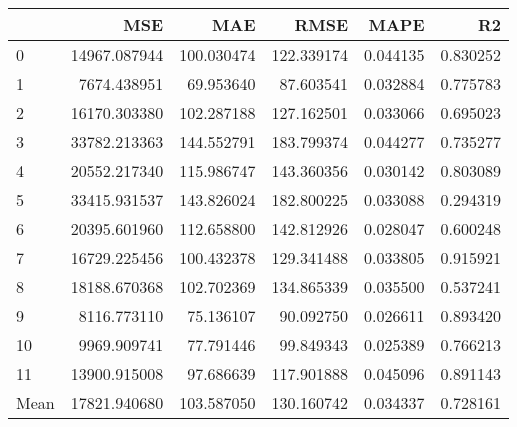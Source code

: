 \begin{tabular}{lrrrrr}
\toprule
 & MSE & MAE & RMSE & MAPE & R2 \\
\midrule
0 & 14967.087944 & 100.030474 & 122.339174 & 0.044135 & 0.830252 \\
1 & 7674.438951 & 69.953640 & 87.603541 & 0.032884 & 0.775783 \\
2 & 16170.303380 & 102.287188 & 127.162501 & 0.033066 & 0.695023 \\
3 & 33782.213363 & 144.552791 & 183.799374 & 0.044277 & 0.735277 \\
4 & 20552.217340 & 115.986747 & 143.360356 & 0.030142 & 0.803089 \\
5 & 33415.931537 & 143.826024 & 182.800225 & 0.033088 & 0.294319 \\
6 & 20395.601960 & 112.658800 & 142.812926 & 0.028047 & 0.600248 \\
7 & 16729.225456 & 100.432378 & 129.341488 & 0.033805 & 0.915921 \\
8 & 18188.670368 & 102.702369 & 134.865339 & 0.035500 & 0.537241 \\
9 & 8116.773110 & 75.136107 & 90.092750 & 0.026611 & 0.893420 \\
10 & 9969.909741 & 77.791446 & 99.849343 & 0.025389 & 0.766213 \\
11 & 13900.915008 & 97.686639 & 117.901888 & 0.045096 & 0.891143 \\
Mean & 17821.940680 & 103.587050 & 130.160742 & 0.034337 & 0.728161 \\
\bottomrule
\end{tabular}
